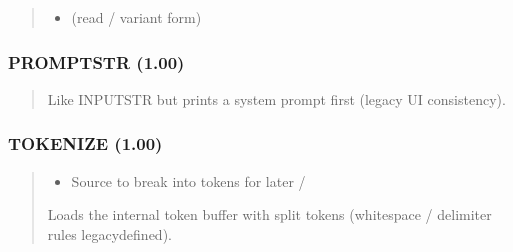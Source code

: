 \documentclass[letterpaper,10pt,english]{sphinxmanual}
\begin{document}
\begin{quote}
\begin{description}
\begin{itemize}
\item {} 
\sphinxAtStartPar
{} (read / variant form)

\end{itemize}

\end{description}
\end{quote}


\subsubsection{PROMPTSTR (1.00)}
\label{\detokenize{ppl:promptstr-1-00}}\begin{quote}

\sphinxAtStartPar
{}
\begin{description}
\sphinxAtStartPar
Like INPUTSTR but prints a system prompt first (legacy UI consistency).

\end{description}
\end{quote}


\subsubsection{TOKENIZE (1.00)}
\label{\detokenize{ppl:tokenize-1-00}}\begin{quote}

\sphinxAtStartPar
{}
\begin{description}
\begin{itemize}
\item {} 
\sphinxAtStartPar
{} \textendash{} Source to break into tokens for later  / 

\end{itemize}

\sphinxAtStartPar
Loads the internal token buffer with split tokens (whitespace / delimiter rules legacy\sphinxhyphen{}defined).

\end{description}
\end{quote}
\end{document}
